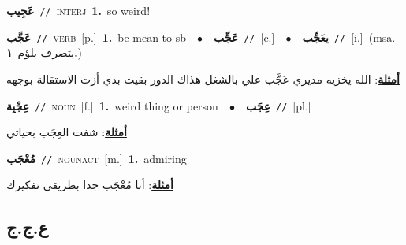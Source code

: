 \documentclass[10pt,a4paper,twoside]{article} %
\begin{document}
\begin{multicols}{2}
{\setlength\topsep{0pt}\textbf{\foreignlanguage{arabic}{عَجِيب}}\ {\color{gray}\texttt{//}\color{black}}\ \textsc{interj}\ \textbf{1.}~so weird!\ } \vspace{2mm}

{\setlength\topsep{0pt}\textbf{\foreignlanguage{arabic}{عَجَّب}}\ {\color{gray}\texttt{//}\color{black}}\ \textsc{verb}\ [p.]\ \textbf{1.}~be mean to sb\ \ $\bullet$\ \ \setlength\topsep{0pt}\textbf{\foreignlanguage{arabic}{عَجِّب}}\ {\color{gray}\texttt{//}\color{black}}\ [c.]\ \ $\bullet$\ \ \setlength\topsep{0pt}\textbf{\foreignlanguage{arabic}{يعَجِّب}}\ {\color{gray}\texttt{//}\color{black}}\ [i.]\ \color{gray}(msa. \foreignlanguage{arabic}{يتصرف بلؤم}~\foreignlanguage{arabic}{\textbf{١.}})\color{black}\  \begin{flushright}\color{gray}\foreignlanguage{arabic}{\textbf{\underline{\foreignlanguage{arabic}{أمثلة}}}: الله يخزيه مديري عَجَّب علي بالشغل هذاك الدور بقيت بدي أزت الاستقالة بوجهه}\end{flushright}\color{black}} \vspace{2mm}

{\setlength\topsep{0pt}\textbf{\foreignlanguage{arabic}{عِجْبِة}}\ {\color{gray}\texttt{//}\color{black}}\ \textsc{noun}\ [f.]\ \textbf{1.}~weird thing or person\ \ $\bullet$\ \ \setlength\topsep{0pt}\textbf{\foreignlanguage{arabic}{عِجَب}}\ {\color{gray}\texttt{//}\color{black}}\ [pl.]\  \begin{flushright}\color{gray}\foreignlanguage{arabic}{\textbf{\underline{\foreignlanguage{arabic}{أمثلة}}}: شفت العِجَب بحياتي}\end{flushright}\color{black}} \vspace{2mm}

{\setlength\topsep{0pt}\textbf{\foreignlanguage{arabic}{مُعْجَب}}\ {\color{gray}\texttt{//}\color{black}}\ \textsc{noun\textunderscore act}\ [m.]\ \textbf{1.}~admiring\  \begin{flushright}\color{gray}\foreignlanguage{arabic}{\textbf{\underline{\foreignlanguage{arabic}{أمثلة}}}: أنا مُعْجَب جدا بطريقى تفكيرك}\end{flushright}\color{black}} \vspace{2mm}

\vspace{-3mm}
\subsection*{\color{blue}\foreignlanguage{arabic}{ع.ج.ج}\color{blue}{}} 


\end{multicols}
\end{document}
